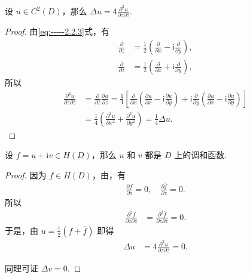\documentclass[../../main.tex]{subfiles}
\begin{document}
\begin{proposition}
设 $u \in C^2(D)$，那么 $\Delta u = 4 \frac{\partial^2 u}{\partial z \partial \overline{z}}$.
\end{proposition}
\begin{proof}
由\eqref{eq:-----2.2.3}式，有
\begin{align*}
\frac{\partial}{\partial z} &= \frac{1}{2}\left( \frac{\partial}{\partial x} - \text{i}\frac{\partial}{\partial y} \right), \\
\frac{\partial}{\partial \overline{z}} &= \frac{1}{2}\left( \frac{\partial}{\partial x} + \text{i}\frac{\partial}{\partial y} \right),
\end{align*}
所以
\begin{align*}
\frac{\partial^2 u}{\partial z \partial \overline{z}} &= \frac{\partial}{\partial \overline{z}} \frac{\partial u}{\partial z} = \frac{1}{4} \left[ \frac{\partial}{\partial x} \left( \frac{\partial u}{\partial x} - \mathrm{i} \frac{\partial u}{\partial y} \right) + \mathrm{i} \frac{\partial}{\partial y} \left( \frac{\partial u}{\partial x} - \mathrm{i} \frac{\partial u}{\partial y} \right) \right] \\
&= \frac{1}{4} \left( \frac{\partial^2 u}{\partial x^2} + \frac{\partial^2 u}{\partial y^2} \right) = \frac{1}{4} \Delta u.
\end{align*}

\end{proof}

\begin{theorem}\label{theorem:全纯函数的实部和虚部都是调和函数}
设 $f = u + \mathrm{i}v \in H(D)$，那么 $u$ 和 $v$ 都是 $D$ 上的调和函数.
\end{theorem}
\begin{proof}
因为 $f \in H(D)$，由，有
\begin{align*}
\frac{\partial f}{\partial \overline{z}} = 0, \quad
\frac{\partial \overline{f}}{\partial z} = 0.
\end{align*}
所以
\begin{align*}
\frac{\partial^2 f}{\partial z \partial \overline{z}} &= \frac{\partial^2 \overline{f}}{\partial z \partial \overline{z}} = 0.
\end{align*}
于是，由 $u = \frac{1}{2}(f + \overline{f})$ 即得
\begin{align*}
\Delta u &= 4 \frac{\partial^2 u}{\partial z \partial \overline{z}} = 0.
\end{align*}

同理可证 $\Delta v = 0$.

\end{proof}
\end{document}
